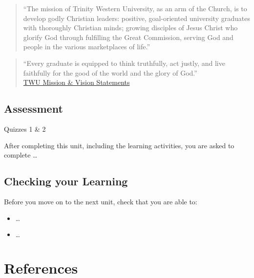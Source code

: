 \documentclass[
]{book}
\providecommand{\tightlist}{%
  \setlength{\itemsep}{0pt}\setlength{\parskip}{0pt}}
\theoremstyle{definition}
\theoremstyle{definition}
\theoremstyle{definition}
\theoremstyle{definition}
\theoremstyle{remark}
\begin{document}
\begin{quote}
``The mission of Trinity Western University, as an arm of the Church, is to develop godly Christian leaders: positive, goal-oriented university graduates with thoroughly Christian minds; growing disciples of Jesus Christ who glorify God through fulfilling the Great Commission, serving God and people in the various marketplaces of life.''
\end{quote}

\begin{quote}
``Every graduate is equipped to think truthfully, act justly, and live faithfully for the good of the world and the glory of God.''\\
\href{https://www.twu.ca/about-us/commitments/mission-vision}{TWU Mission \& Vision Statements}
\end{quote}

\hypertarget{assessment-5}{%
\section*{Assessment}\label{assessment-5}}

\begin{assessment}
{Quizzes 1 \& 2}

After completing this unit, including the learning activities, you are asked to complete \ldots{}
\end{assessment}

\hypertarget{checking-your-learning-5}{%
\section*{Checking your Learning}\label{checking-your-learning-5}}

\begin{progress}
Before you move on to the next unit, check that you are able to:

\begin{itemize}
\tightlist
\item
  \ldots{}
\item
  \ldots{}
\end{itemize}
\end{progress}

\hypertarget{references}{%
\chapter*{References}\label{references}}
\end{document}
